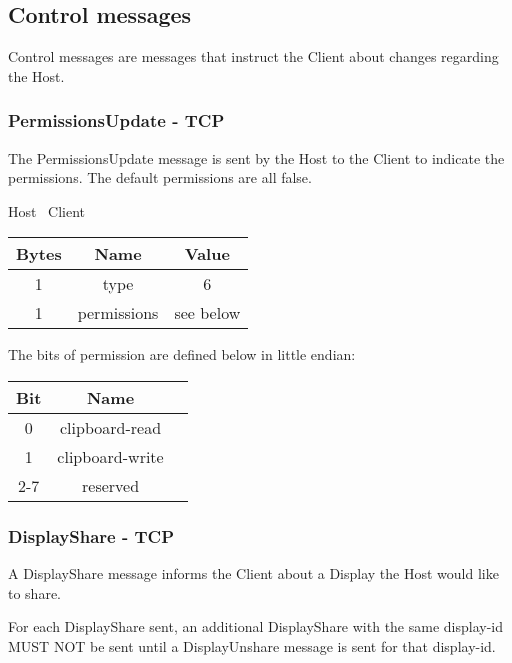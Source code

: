 \subsection{Control messages}
Control messages are messages that instruct the Client about changes regarding the Host.

\subsubsection{PermissionsUpdate - TCP}

The PermissionsUpdate message is sent by the Host to the Client to indicate the permissions.
The default permissions are all false.

\begin{center}
    Host \textrightarrow\ Client\\
    \begin{tabular}{|c|c|c|}
        \hline
        \textbf{Bytes} & \textbf{Name} & \textbf{Value} \\
        \hline
        1              & type          & 6              \\
        \hline
        1              & permissions   & see below      \\
        \hline
    \end{tabular}
\end{center}

The bits of permission are defined below in little endian:

\begin{center}
    \begin{tabular}{|c|c|c|}
        \hline
        \textbf{Bit} & \textbf{Name}   \\
        \hline
        0            & clipboard-read  \\
        \hline
        1            & clipboard-write \\
        \hline
        2-7          & reserved        \\
        \hline
    \end{tabular}
\end{center}

\subsubsection{DisplayShare - TCP}
A DisplayShare message informs the Client about a Display the Host would like to share.

For each DisplayShare sent, an additional DisplayShare with the same display-id MUST NOT be sent until a
DisplayUnshare message is sent for that display-id.

